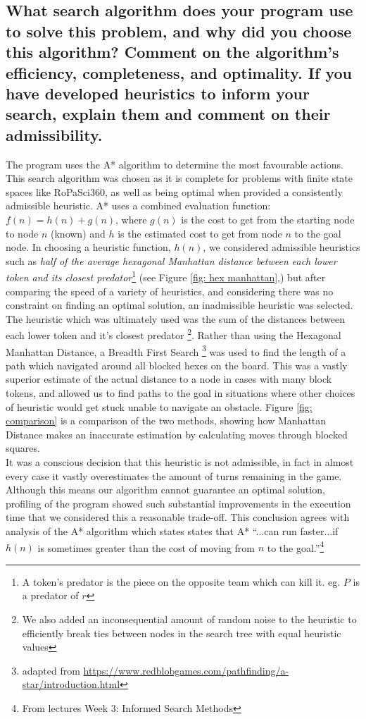 \documentclass{article}
\begin{document}
\subsection*{What search algorithm does your program use to solve this problem, and why did you choose this algorithm? Comment on the algorithm’s efficiency, completeness, and optimality. If you have developed heuristics to inform your search, explain them and comment on their admissibility.}
The program uses the A* algorithm to determine the most favourable actions. This search algorithm was chosen as it is complete for problems with finite state spaces like RoPaSci360, as well as being optimal when provided a consistently admissible heuristic. A* uses a combined evaluation function: $f(n) = h(n) + g(n)$, where $g(n)$ is the cost to get from the starting node to node $n$ (known) and $h$ is the estimated cost to get from node $n$ to the goal node. In choosing a heuristic function, $h(n)$, we considered admissible heuristics such as \textit{half of the average hexagonal Manhattan distance between each lower token and its closest predator}\footnote{A token's predator is the piece on the opposite team which can kill it. eg. $P$ is a predator of $r$} (see Figure \ref{fig: hex manhattan},) but after comparing the speed of a variety of heuristics, and considering there was no constraint on finding an optimal solution, an inadmissible heuristic was selected.\\[2mm]
The heuristic which was ultimately used was the sum of the distances between each lower token and it's closest predator \footnote{We also added an inconsequential amount of random noise to the heuristic to efficiently break ties between nodes in the search tree with equal heuristic values}. Rather than using the Hexagonal Manhattan Distance, a Breadth First Search \footnote{adapted from \url{https://www.redblobgames.com/pathfinding/a-star/introduction.html}} was used to find the length of a path which navigated around all blocked hexes on the board. This was a vastly superior estimate of the actual distance to a node in cases with many block tokens, and allowed us to find paths to the goal in situations where other choices of heuristic would get stuck unable to navigate an obstacle. Figure \ref{fig: comparison} is a comparison of the two methods, showing how Manhattan Distance makes an inaccurate estimation by calculating moves through blocked squares.\\[2mm]
It was a conscious decision that this heuristic is not admissible, in fact in almost every case it vastly overestimates the amount of turns remaining in the game. Although this means our algorithm cannot guarantee an optimal solution, profiling of the program showed such substantial improvements in the execution time that we considered this a reasonable trade-off. This conclusion agrees with analysis of the A* algorithm which states states that A* ``...can run faster...if $h(n)$ is sometimes greater than the cost of moving from $n$ to the goal.''\footnote{From lectures Week 3: Informed Search Methods}
\end{document}
